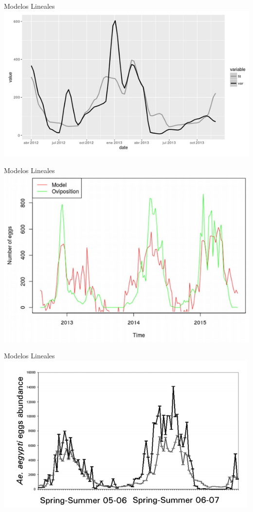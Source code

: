 \documentclass[10pt]{beamer}
\begin{document}
\begin{frame}{Modelos Lineales}
  \includegraphics[width=\textwidth]{lineal1.png}
\end{frame}

\begin{frame}{Modelos Lineales}
  \includegraphics[width=\textwidth]{lineal2.png}
\end{frame}

\begin{frame}{Modelos Lineales}
  \includegraphics[width=\textwidth]{lineal3.png}
\end{frame}
\end{document}
